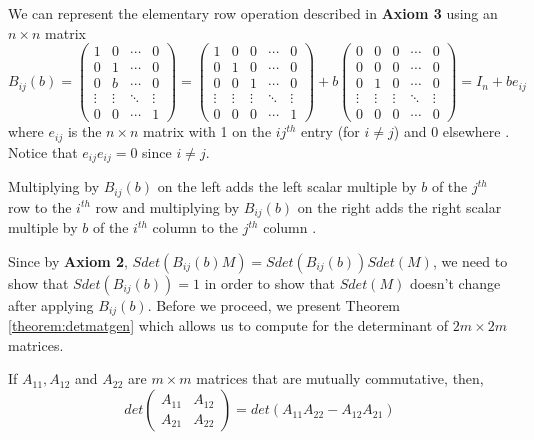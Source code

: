 We can represent the elementary row operation described in \textbf{Axiom 3} using an $n \times n$ matrix \\$B_{ij}(b) = 
		\begin{pmatrix}
			1 & 0 & \cdots & 0 \\
			0 & 1 & \cdots & 0 \\
			0 & b & \cdots & 0 \\
			\vdots & \vdots & \ddots & \vdots \\
			0 & 0 & \cdots & 1 
		\end{pmatrix}
		=
		\begin{pmatrix}
			1 & 0 & 0 & \cdots & 0 \\
			0 & 1 & 0 & \cdots & 0 \\
			0 & 0 & 1 & \cdots & 0 \\
			\vdots & \vdots & \vdots & \ddots & \vdots \\
			0 & 0 & 0 & \cdots & 1
		\end{pmatrix} + b
		\begin{pmatrix}
			0 & 0 & 0 & \cdots & 0 \\
			0 & 0 & 0 & \cdots & 0 \\
			0 & 1 & 0 & \cdots & 0 \\
			\vdots & \vdots & \vdots & \ddots & \vdots \\
			0 & 0 & 0 & \cdots & 0
		\end{pmatrix} = I_n + be_{ij}$ \\where $e_{ij}$ is the $n\times n$ matrix with 1 on the $ij^{th}$ entry (for $i \neq j$) and 0 elsewhere \cite{aslaksen}. Notice that $e_{ij}e_{ij}=0$ since $i \neq j$.

		Multiplying by $B_{ij}(b)$ on the left adds the left scalar multiple by $b$ of the $j^{th}$ row to the $i^{th}$ row and multiplying by $B_{ij}(b)$ on the right adds the right scalar multiple by $b$ of the $i^{th}$ column to the $j^{th}$ column \cite{aslaksen}.

		Since by \textbf{Axiom 2}, $Sdet(B_{ij}(b)M) = Sdet(B_{ij}(b))Sdet(M)$, we need to show that $Sdet(B_{ij}(b)) = 1$ in order to show that $Sdet(M)$ doesn't change after applying $B_{ij}(b)$. Before we proceed, we present Theorem \ref{theorem:detmatgen} which allows us to compute for the determinant of $2m\times 2m$ matrices.

\begin{theorem} \label{theorem:detmatgen}
	\emph{\cite{aslaksen}} If $A_{11}, A_{12}$ and $A_{22}$ are $m \times m$ matrices that are mutually commutative, then,
	\begin{equation*}
		det
		\begin{pmatrix}
			A_{11} & A_{12} \\
			A_{21} & A_{22}
		\end{pmatrix}
		= det(A_{11}A_{22} - A_{12}A_{21})
	\end{equation*}
\end{theorem}

